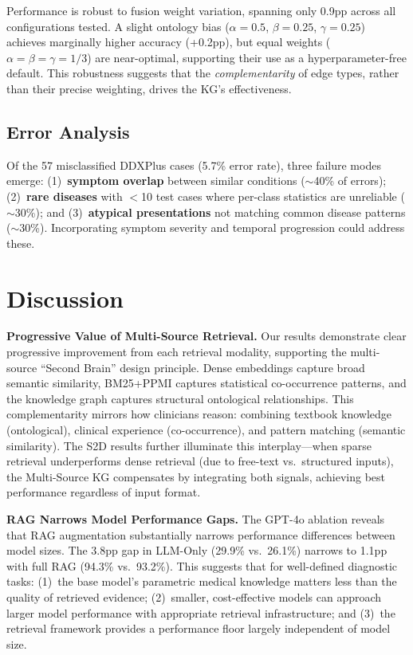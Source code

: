 \documentclass[runningheads]{llncs}
\begin{document}
Performance is robust to fusion weight variation, spanning only 0.9pp across all configurations tested. A slight ontology bias ($\alpha{=}0.5$, $\beta{=}0.25$, $\gamma{=}0.25$) achieves marginally higher accuracy (+0.2pp), but equal weights ($\alpha{=}\beta{=}\gamma{=}1/3$) are near-optimal, supporting their use as a hyperparameter-free default. This robustness suggests that the \emph{complementarity} of edge types, rather than their precise weighting, drives the KG's effectiveness.

\subsection{Error Analysis}
\label{sec:error_analysis}

Of the 57 misclassified DDXPlus cases (5.7\% error rate), three failure modes emerge: (1)~\textbf{symptom overlap} between similar conditions (${\sim}$40\% of errors); (2)~\textbf{rare diseases} with $<$10 test cases where per-class statistics are unreliable (${\sim}$30\%); and (3)~\textbf{atypical presentations} not matching common disease patterns (${\sim}$30\%). Incorporating symptom severity and temporal progression could address these.

\section{Discussion}
\label{sec:discussion}

\textbf{Progressive Value of Multi-Source Retrieval.}
Our results demonstrate clear progressive improvement from each retrieval modality, supporting the multi-source ``Second Brain'' design principle. Dense embeddings capture broad semantic similarity, BM25+PPMI captures statistical co-occurrence patterns, and the knowledge graph captures structural ontological relationships. This complementarity mirrors how clinicians reason: combining textbook knowledge (ontological), clinical experience (co-occurrence), and pattern matching (semantic similarity). The S2D results further illuminate this interplay---when sparse retrieval underperforms dense retrieval (due to free-text vs.\ structured inputs), the Multi-Source KG compensates by integrating both signals, achieving best performance regardless of input format.

\textbf{RAG Narrows Model Performance Gaps.}
The GPT-4o ablation reveals that RAG augmentation substantially narrows performance differences between model sizes. The 3.8pp gap in LLM-Only (29.9\% vs.\ 26.1\%) narrows to 1.1pp with full RAG (94.3\% vs.\ 93.2\%). This suggests that for well-defined diagnostic tasks: (1)~the base model's parametric medical knowledge matters less than the quality of retrieved evidence; (2)~smaller, cost-effective models can approach larger model performance with appropriate retrieval infrastructure; and (3)~the retrieval framework provides a performance floor largely independent of model size.
\end{document}
